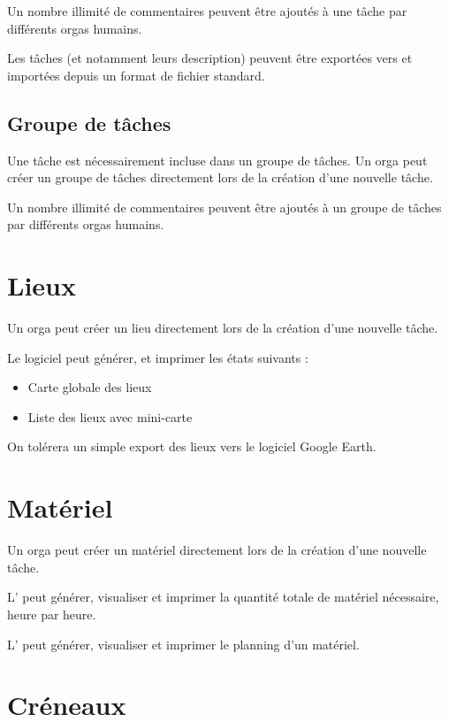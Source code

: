 Un nombre illimité de commentaires peuvent être ajoutés à une tâche par différents orgas humains.


Les tâches (et notamment leurs description) peuvent être exportées vers et importées depuis un format de fichier standard.


\subsection{Groupe de tâches}
Une tâche est nécessairement incluse dans un groupe de tâches.
Un orga peut créer un groupe de tâches directement lors de la création d'une nouvelle tâche.

Un nombre illimité de commentaires peuvent être ajoutés à un groupe de tâches par différents orgas humains.

\section{Lieux}
Un orga peut créer un lieu directement lors de la création d'une nouvelle tâche.

Le logiciel peut générer, et imprimer les états suivants :
\begin{itemize}
 \item Carte globale des lieux
\item Liste des lieux avec mini-carte
\end{itemize}
On tolérera un simple export des lieux vers le logiciel Google Earth\textregistered{}.

\section{Matériel}

Un orga peut créer un matériel directement lors de la création d'une nouvelle tâche.

L'\oh{} peut générer, visualiser et imprimer la quantité totale de matériel nécessaire, heure par heure.

L'\oh{} peut générer, visualiser et imprimer le planning d'un matériel.

\section{Créneaux}

